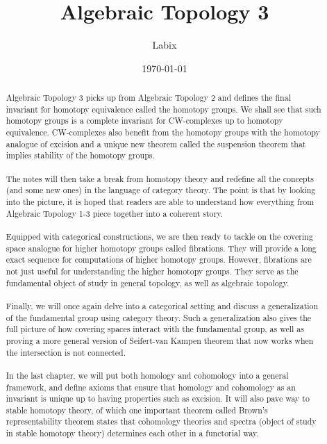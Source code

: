 \documentclass[a4paper]{article}
\title{Algebraic Topology 3}
\author{Labix}
\date{\today}
\begin{document}
\maketitle
\begin{abstract}
Algebraic Topology 3 picks up from Algebraic Topology 2 and defines the final invariant for homotopy equivalence called the homotopy groups. We shall see that such homotopy groups is a complete invariant for CW-complexes up to homotopy equivalence. CW-complexes also benefit from the homotopy groups with the homotopy analogue of excision and a unique new theorem called the suspension theorem that implies stability of the homotopy groups. \\~\\

The notes will then take a break from homotopy theory and redefine all the concepts (and some new ones) in the language of category theory. The point is that by looking into the picture, it is hoped that readers are able to understand how everything from Algebraic Topology 1-3 piece together into a coherent story. \\~\\

Equipped with categorical constructions, we are then ready to tackle on the covering space analogue for higher homotopy groups called fibrations. They will provide a long exact sequence for computations of higher homotopy groups. However, fibrations are not just useful for understanding the higher homotopy groups. They serve as the fundamental object of study in general topology, as well as algebraic topology. \\~\\

Finally, we will once again delve into a categorical setting and discuss a generalization of the fundamental group using category theory. Such a generalization also gives the full picture of how covering spaces interact with the fundamental group, as well as proving a more general version of Seifert-van Kampen theorem that now works when the intersection is not connected. \\~\\

In the last chapter, we will put both homology and cohomology into a general framework, and define axioms that ensure that homology and cohomology as an invariant is unique up to having properties such as excision. It will also pave way to stable homotopy theory, of which one important theorem called Brown's representability theorem states that cohomology theories and spectra (object of study in stable homotopy theory) determines each other in a functorial way. 
\end{abstract}
\end{document}
